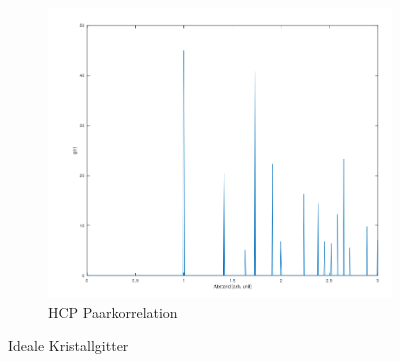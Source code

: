 \documentclass[12pt,a4paper,ngerman]{article}
\begin{document}
\begin{figure}[ht]
	\begin{subfigure}[b]{0.3\textwidth}
		\includegraphics[width=\textwidth]{data/HCP_perfect_paarcorr.png}
		\caption{HCP Paarkorrelation}
	\end{subfigure}
		
	\caption{Ideale Kristallgitter}
	\label{fig:Ideal}
\end{figure}
\end{document}
